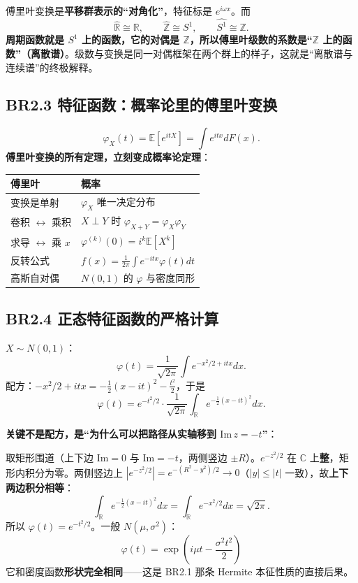 傅里叶变换是\textbf{平移群表示的“对角化”}，特征标是 $e^{i\omega x}$。而
\[
\widehat{\mathbb{R}}\cong\mathbb{R},\qquad
\widehat{\mathbb{Z}}\cong S^1,\qquad
\widehat{S^1}\cong\mathbb{Z}.
\]
\textbf{周期函数就是 $S^1$ 上的函数，它的对偶是 $\mathbb{Z}$，所以傅里叶级数的系数是“$\mathbb{Z}$ 上的函数”（离散谱）}。级数与变换是同一对偶框架在两个群上的样子，这就是“离散谱与连续谱”的终极解释。

\subsection{BR2.3 特征函数：概率论里的傅里叶变换}

\[
\varphi_X(t)=\mathbb{E}[e^{itX}]=\int e^{itx}dF(x).
\]
\textbf{傅里叶变换的所有定理，立刻变成概率论定理}：

\begin{center}
\begin{tabular}{L{4.5cm}L{6.5cm}}
\toprule
\textbf{傅里叶} & \textbf{概率} \\
\midrule
变换是单射 & $\varphi_X$ 唯一决定分布 \\
卷积 $\leftrightarrow$ 乘积 & $X\perp Y$ 时 $\varphi_{X+Y}=\varphi_X\varphi_Y$ \\
求导 $\leftrightarrow$ 乘 $x$ & $\varphi^{(k)}(0)=i^k\mathbb{E}[X^k]$ \\
反转公式 & $f(x)=\frac{1}{2\pi}\int e^{-itx}\varphi(t)dt$ \\
高斯自对偶 & $N(0,1)$ 的 $\varphi$ 与密度同形 \\
\bottomrule
\end{tabular}
\end{center}

\subsection{BR2.4 正态特征函数的严格计算}

$X\sim N(0,1)$：
\[
\varphi(t)=\frac{1}{\sqrt{2\pi}}\int e^{-x^2/2+itx}dx .
\]
配方：$-x^2/2+itx=-\frac12(x-it)^2-\frac{t^2}{2}$，于是
\[
\varphi(t)=e^{-t^2/2}\cdot\frac{1}{\sqrt{2\pi}}
\int_{\mathbb{R}}e^{-\frac12(x-it)^2}dx .
\]

\textbf{关键不是配方，是“为什么可以把路径从实轴移到 $\mathrm{Im}\,z=-t$”}：

取矩形围道（上下边 $\mathrm{Im}=0$ 与 $\mathrm{Im}=-t$，两侧竖边 $\pm R$）。$e^{-z^2/2}$ 在 $\mathbb{C}$ 上\textbf{整}，矩形内积分为零。两侧竖边上
$|e^{-z^2/2}|=e^{-(R^2-y^2)/2}\to0$（$|y|\le|t|$ 一致），故\textbf{上下两边积分相等}：
\[
\int_{\mathbb{R}}e^{-\frac12(x-it)^2}dx=\int_{\mathbb{R}}e^{-x^2/2}dx=\sqrt{2\pi}.
\]
所以 $\varphi(t)=e^{-t^2/2}$。一般 $N(\mu,\sigma^2)$：
\[
\boxed{\ \varphi(t)=\exp\left(i\mu t-\frac{\sigma^2t^2}{2}\right)\ }
\]
它和密度函数\textbf{形状完全相同}——这是 BR2.1 那条 Hermite 本征性质的直接后果。

